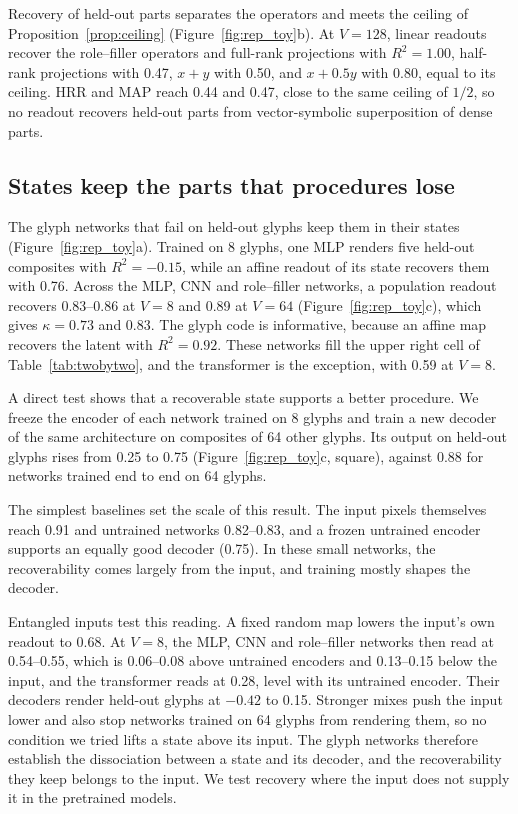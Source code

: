 \documentclass[10pt]{article}
\theoremstyle{plain}
\theoremstyle{remark}
\begin{document}
Recovery of held-out parts separates the operators and meets the ceiling of Proposition~\ref{prop:ceiling} (Figure~\ref{fig:rep_toy}b). At $V = 128$, linear readouts recover the role--filler operators and full-rank projections with $R^2 = 1.00$, half-rank projections with 0.47, $x + y$ with 0.50, and $x + 0.5y$ with 0.80, equal to its ceiling. HRR and MAP reach 0.44 and 0.47, close to the same ceiling of $1/2$, so no readout recovers held-out parts from vector-symbolic superposition of dense parts.

\subsection{States keep the parts that procedures lose}
\label{sec:states}

The glyph networks that fail on held-out glyphs keep them in their states (Figure~\ref{fig:rep_toy}a). Trained on 8 glyphs, one MLP renders five held-out composites with $R^2 = -0.15$, while an affine readout of its state recovers them with 0.76. Across the MLP, CNN and role--filler networks, a population readout recovers 0.83--0.86 at $V = 8$ and 0.89 at $V = 64$ (Figure~\ref{fig:rep_toy}c), which gives $\kappa = 0.73$ and $0.83$. The glyph code is informative, because an affine map recovers the latent with $R^2 = 0.92$. These networks fill the upper right cell of Table~\ref{tab:twobytwo}, and the transformer is the exception, with 0.59 at $V = 8$.

A direct test shows that a recoverable state supports a better procedure. We freeze the encoder of each network trained on 8 glyphs and train a new decoder of the same architecture on composites of 64 other glyphs. Its output on held-out glyphs rises from 0.25 to 0.75 (Figure~\ref{fig:rep_toy}c, square), against 0.88 for networks trained end to end on 64 glyphs.

The simplest baselines set the scale of this result. The input pixels themselves reach 0.91 and untrained networks 0.82--0.83, and a frozen untrained encoder supports an equally good decoder (0.75). In these small networks, the recoverability comes largely from the input, and training mostly shapes the decoder.

Entangled inputs test this reading. A fixed random map lowers the input's own readout to 0.68. At $V = 8$, the MLP, CNN and role--filler networks then read at 0.54--0.55, which is 0.06--0.08 above untrained encoders and 0.13--0.15 below the input, and the transformer reads at 0.28, level with its untrained encoder. Their decoders render held-out glyphs at $-0.42$ to 0.15. Stronger mixes push the input lower and also stop networks trained on 64 glyphs from rendering them, so no condition we tried lifts a state above its input. The glyph networks therefore establish the dissociation between a state and its decoder, and the recoverability they keep belongs to the input. We test recovery where the input does not supply it in the pretrained models.
\end{document}
